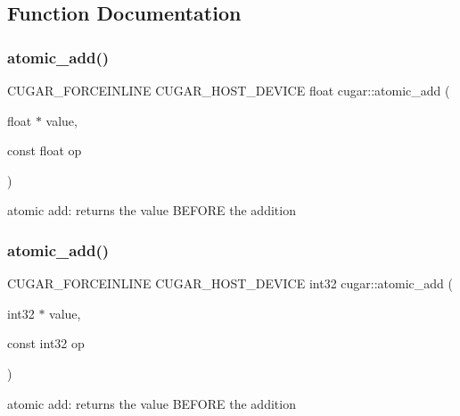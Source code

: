 \subsection{Function Documentation}
\mbox{\label{group___atomics_ga0c9d949be7ac5b6f27a232c7cd27a05c}} 
\subsubsection{\texorpdfstring{atomic\+\_\+add()}{atomic\_add()}\hspace{0.1cm}{\footnotesize\ttfamily [1/4]}}
{\footnotesize\ttfamily C\+U\+G\+A\+R\+\_\+\+F\+O\+R\+C\+E\+I\+N\+L\+I\+NE C\+U\+G\+A\+R\+\_\+\+H\+O\+S\+T\+\_\+\+D\+E\+V\+I\+CE float cugar\+::atomic\+\_\+add (\begin{DoxyParamCaption}\item[{float $\ast$}]{value,  }\item[{const float}]{op }\end{DoxyParamCaption})}

atomic add\+: returns the value B\+E\+F\+O\+RE the addition \mbox{\label{group___atomics_ga584797bd163a76c90bf0fb5c7df58de4}} 
\subsubsection{\texorpdfstring{atomic\+\_\+add()}{atomic\_add()}\hspace{0.1cm}{\footnotesize\ttfamily [2/4]}}
{\footnotesize\ttfamily C\+U\+G\+A\+R\+\_\+\+F\+O\+R\+C\+E\+I\+N\+L\+I\+NE C\+U\+G\+A\+R\+\_\+\+H\+O\+S\+T\+\_\+\+D\+E\+V\+I\+CE int32 cugar\+::atomic\+\_\+add (\begin{DoxyParamCaption}\item[{int32 $\ast$}]{value,  }\item[{const int32}]{op }\end{DoxyParamCaption})}

atomic add\+: returns the value B\+E\+F\+O\+RE the addition \mbox{\label{group___atomics_ga130aea0c6d0c91af08bea4b52d6a8208}} 
